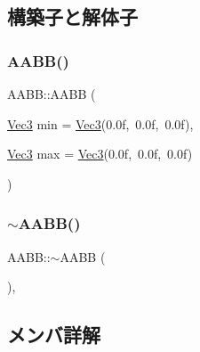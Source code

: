 \subsection{構築子と解体子}
\mbox{\label{class_a_a_b_b_a409e2c536eb56fb3e3b1147f8478edea}} 
\subsubsection{\texorpdfstring{A\+A\+B\+B()}{AABB()}}
{\footnotesize\ttfamily A\+A\+B\+B\+::\+A\+A\+BB (\begin{DoxyParamCaption}\item[{\mbox{\hyperlink{_vector3_d_8h_ab16f59e4393f29a01ec8b9bbbabbe65d}{Vec3}}}]{min = {\ttfamily \mbox{\hyperlink{_vector3_d_8h_ab16f59e4393f29a01ec8b9bbbabbe65d}{Vec3}}(0.0f,~0.0f,~0.0f)},  }\item[{\mbox{\hyperlink{_vector3_d_8h_ab16f59e4393f29a01ec8b9bbbabbe65d}{Vec3}}}]{max = {\ttfamily \mbox{\hyperlink{_vector3_d_8h_ab16f59e4393f29a01ec8b9bbbabbe65d}{Vec3}}(0.0f,~0.0f,~0.0f)} }\end{DoxyParamCaption})\hspace{0.3cm}{\ttfamily [inline]}}

\mbox{\label{class_a_a_b_b_afd5f4956a2043597167ff66821f7b223}} 
\subsubsection{\texorpdfstring{$\sim$\+A\+A\+B\+B()}{~AABB()}}
{\footnotesize\ttfamily A\+A\+B\+B\+::$\sim$\+A\+A\+BB (\begin{DoxyParamCaption}{ }\end{DoxyParamCaption})\hspace{0.3cm}{\ttfamily [inline]}, {\ttfamily [virtual]}}



\subsection{メンバ詳解}
\mbox{\label{class_a_a_b_b_a7f8dca79cab056729bde7139b219fcbe}} 
